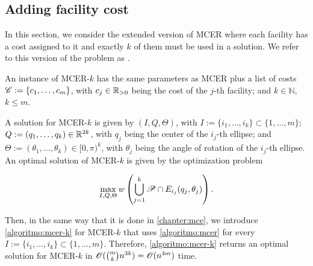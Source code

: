 \subsection{Adding facility cost}

In this section, we consider the extended version of MCER where each facility has a cost assigned to it and exactly $k$ of them must be used in a solution. We refer to this version of the problem as . 

An instance of MCER-$k$ has the same parameters as MCER plus a list of costs \mbox{$\mathscr{C}:=\{c_1, \dots, c_m\}$}, with $c_j\in\mathbb{R}_{>0}$ being the cost of the $j$-th facility; and $k\in\mathbb{N}$, $k\le m$.

A solution for MCER-$k$ is given by $(I, Q, \Theta)$, with $I:=\{i_1, \dots, i_k\}\subset \{1, \dots, m\}$; \\\mbox{$Q:=(q_1, \dots, q_k)\in\mathbb{R}^{2k}$}, with $q_j$ being the center of the $i_j$-th ellipse; and \mbox{$\Theta:=(\theta_1, \dots, \theta_k) \in [0, \pi)^k$}, with $\theta_j$ being the angle of rotation of the $i_j$-th ellipse. An optimal solution of MCER-$k$ is given by the optimization problem

\begin{equation*}
	\max_{I, Q, \Theta} w\left(\bigcup_{j=1}^k \mathscr{P} \cap E_{i_j}(q_j, \theta_j)\right).
\end{equation*}

Then, in the same way that it is done in \autoref{chapter:mce}, we introduce \autoref{algoritmo:mcer-k} for MCER-$k$ that uses \autoref{algoritmo:mcer} for every $I:=\{i_1, \dots, i_k\} \subset \{1, \dots, m\}$. Therefore, \autoref{algoritmo:mcer-k} returns an optimal solution for MCER-$k$ in $\mathscr{O}(\binom{m}{k}n^{3k}) = \mathscr{O}(n^{4m})$ time.

